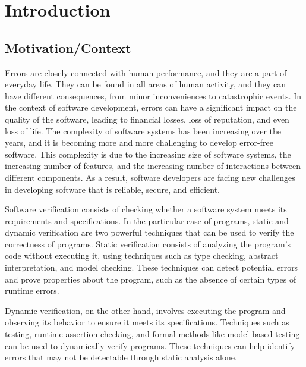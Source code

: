 
%

\chapter{Introduction}
\label{cha:introduction}

\section{Motivation/Context}
\label{sec:motivation_context}

Errors are closely connected with human performance, and they are a part of everyday life. 
They can be found in all areas of human activity, and they can have different consequences, 
from minor inconveniences to catastrophic events. In the context of software development, 
errors can have a significant impact on the quality of the software, leading to financial losses, 
loss of reputation, and even loss of life. The complexity of software systems has been increasing 
over the years, and it is becoming more and more challenging to develop error-free software. 
This complexity is due to the increasing size of software systems, the increasing number of features, 
and the increasing number of interactions between different components. As a result, software 
developers are facing new challenges in developing software that is reliable, secure, and efficient.

Software verification consists of checking whether a software system meets its requirements and
specifications. In the particular case of \ocaml programs, static and dynamic verification are two powerful 
techniques that can be used to verify the correctness of \ocaml programs. Static verification consists of 
analyzing the program's code without executing it, using techniques such as type checking, abstract 
interpretation, and model checking. These techniques can detect potential errors and prove properties 
about the program, such as the absence of certain types of runtime errors.

Dynamic verification, on the other hand, involves executing the program and observing its behavior 
to ensure it meets its specifications. Techniques such as testing, runtime assertion checking, and 
formal methods like model-based testing can be used to dynamically verify \ocaml programs. 
These techniques can help identify errors that may not be detectable through static analysis alone.

